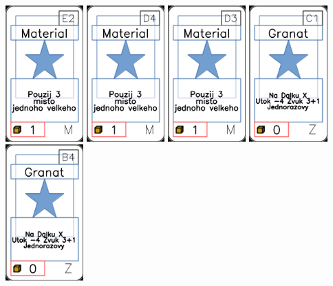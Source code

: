 \documentclass[a4paper]{article}
\begin{document}
	\includegraphics[width=3.0cm]{img-1_51}
	\includegraphics[width=3.0cm]{img-1_48}
	\includegraphics[width=3.0cm]{img-1_47}
	\includegraphics[width=3.0cm]{img-1_100}
	\includegraphics[width=3.0cm]{img-1_98}
\end{document}
